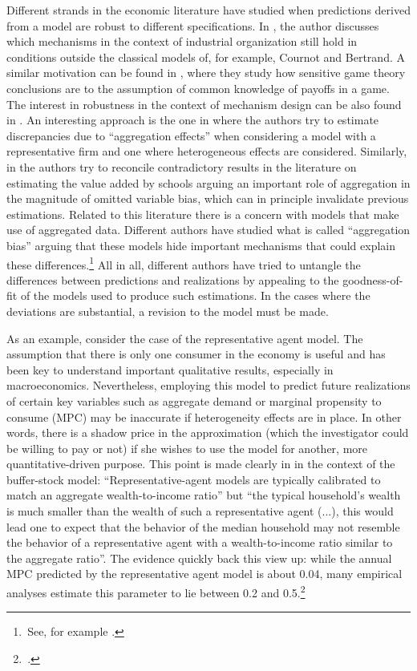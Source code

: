 \documentclass[english, a4paper, 12pt]{article}
\begin{document}
Different strands in the economic literature have studied when predictions derived from a model are robust to different specifications. In \cite{SuttonMarketStruct}, the author discusses which mechanisms in the context of industrial organization still hold in conditions outside the classical models of, for example, Cournot and Bertrand. A similar motivation can be found in \cite{Morris97}, where they study how sensitive game theory conclusions are to the assumption of common knowledge of payoffs in a game. The interest in robustness in the context of mechanism design can be also found in \cite{Morris2011}. An interesting approach is the one in \cite{Basu97} where the authors try to estimate discrepancies due to ``aggregation effects'' when considering a model with a representative firm and one where heterogeneous effects are considered. Similarly, in \cite{SchoolAggregation} the authors try to reconcile contradictory results in the literature on estimating the value added by schools arguing an important role of aggregation in the magnitude of omitted variable bias, which can in principle invalidate previous estimations. Related to this literature there is a concern with models that make use of aggregated data. Different authors have studied what is called ``aggregation bias'' arguing that these models hide important mechanisms that could explain these differences.\footnote{\,See, for example \cite{Agg1, Agg2, Agg3, Agg4}.} All in all, different authors have tried to untangle the differences between predictions and realizations by appealing to the goodness-of-fit of the models used to produce such estimations. In the cases where the deviations are substantial, a revision to the model must be made.

As an example, consider the case of the representative agent model. The assumption that there is only one consumer in the economy is useful and has been key to understand important qualitative results, especially in macroeconomics. Nevertheless, employing this model to predict future realizations of certain key variables such as aggregate demand or marginal propensity to consume (MPC) may be inaccurate if heterogeneity effects are in place. In other words, there is a shadow price in the approximation (which the investigator could be willing to pay or not) if she wishes to use the model for another, more quantitative-driven purpose. This point is made clearly in \cite{CarrollRequiem} in the context of the buffer-stock model: ``Representative-agent models are typically calibrated to match an aggregate wealth-to-income ratio'' but ``the typical household’s wealth is much smaller than the wealth of such a representative agent (...), this would lead one to expect that the behavior of the median household may not resemble the behavior of a representative agent with a wealth-to-income ratio similar to the aggregate ratio''. The evidence quickly back this view up: while the annual MPC predicted by the representative agent model is about 0.04, many empirical analyses estimate this parameter to lie between 0.2 and 0.5.\footnote{\,\cite{CarrollRequiem}.} 
\end{document}
